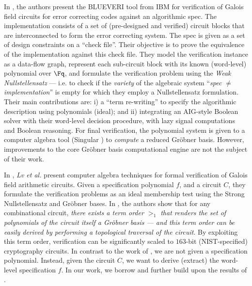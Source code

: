 In \cite{ibm:ecc-ita11} \cite{blueveri:ita} \cite{ibm:blueveri},
the authors present the {\sc BLUEVERI} tool from IBM for verification
of Galois field circuits for error correcting codes against an
algorithmic spec. The implementation consists of a set of
(pre-designed and verified) circuit blocks that are interconnected to
form the error correcting system. The spec is given as a set of design
constraints on a ``check file''. Their objective is to prove the 
equivalence of the implementation against this check file.
They model the verification instance as a data-flow graph, represent each
sub-circuit block with its known (word-level) polynomial over $\Fq$,
and formulate the verification problem using the {\it Weak
  Nullstellensatz} --- i.e. to check if the {\it variety} of the
algebraic system ``{\it spec} $\neq$ {\it implementation}'' is empty
for which they employ a Nullstellensatz formulation.
Their main
contributions are: i) a ``term re-writing'' to specify the algorithmic
description using polynomials (ideal); and ii) integrating an
AIG-style \cite{AIG:2002} Boolean solver with their word-level
decision procedure, with lazy signal computations and Boolean
reasoning. For final verification, the polynomial system is given
to a computer algebra tool ({\sc Singular} \cite{DGPS}) to {\it
  compute} a reduced Gr\"obner basis. However, improvements to the
core Gr\"obner basis computational engine are not the subject of their
work.   

In \cite{lv:phd} 
\cite{lv:tcad2013}
\cite{lv:date2012}
\cite{lv:hldvt2011} \cite{lv:vlsi2012}, {\it Lv et al.} present
computer algebra techniques for formal verification of Galois field
arithmetic circuits. Given a specification polynomial $f$, and a
circuit $C$, they formulate the verification problems as an ideal
membership test using the Strong Nullstellensatz and Gr\"obner
bases. In \cite{lv:date2012}, the authors show that for any
combinational circuit, {\it there exists a term order $>_1$ that
  renders the set of polynomials of the circuit itself a Gr\"obner
  basis --- and this term order can be easily derived 
by performing a topological traversal of the circuit}. By exploiting
this term order, verification can be significantly scaled
to $163$-bit (NIST-specified) cryptography circuits. 
In contrast to the work of \cite{lv:phd}, we are not given a
specification polynomial. Instead, given the circuit $C$, we want
to derive (extract) the word-level specification $f$. In our work, we
borrow and further build upon the results of \cite{gao:gf-gb-ms}
\cite{gao:qe-gf-gb} %
\cite{lv:date2012} \cite{lv:phd}. 

